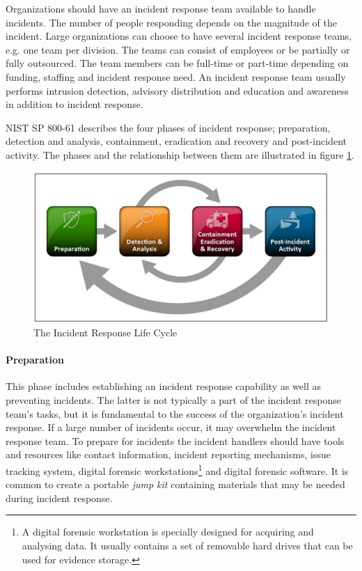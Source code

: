 Organizations should have an incident response team available to handle incidents. The number of people responding depends on the magnitude of the incident. Large organizations can choose to have several incident response teams, e.g. one team per division. The teams can consist of employees or be partially or fully outsourced. The team members can be full-time or part-time depending on funding, staffing and incident response need.  %
An incident response team usually performs intrusion detection, advisory distribution and education and awareness in addition to incident response.

\acs{NIST} SP 800-61 describes the four phases of incident response; preparation, detection and analysis, containment, eradication and recovery and post-incident activity. The phases and the relationship between them are illustrated in figure \ref{fig:NISTIncidentResponse}.

\begin{figure}[ht]
\begin{center}
\includegraphics[scale=0.27]{NISTIncidentResponseCycle.png}
\caption[The Incident Response Life Cycle]{The Incident Response Life Cycle \cite{nist800-61}}
\label{fig:NISTIncidentResponse}
\end{center}
\end{figure}

\paragraph{Preparation} 
This phase includes establishing an incident response capability as well as preventing incidents. The latter is not typically a part of the incident response team's tasks, but it is fundamental to the success of the organization's incident response. If a large number of incidents occur, it may overwhelm the incident response team. To prepare for incidents the incident handlers should have tools and resources like contact information, incident reporting mechanisms, issue tracking system, digital forensic workstations\footnote{A digital forensic workstation is specially designed for acquiring and analysing data. It usually contains a set of removable hard drives that can be used for evidence storage.} and digital forensic software. It is common to create a portable \emph{jump kit} containing materials that may be needed during incident response.

